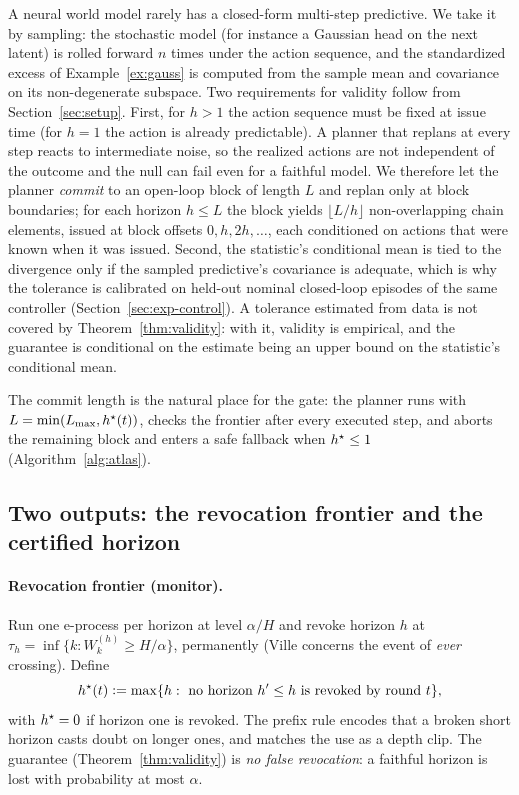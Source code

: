 A neural world model rarely has a closed-form multi-step predictive. We take it by sampling: the stochastic model
(for instance a Gaussian head on the next latent) is rolled forward $n$ times under the action sequence, and the standardized excess of
Example~\ref{ex:gauss} is computed from the sample mean and covariance on its non-degenerate subspace. Two requirements for validity
follow from Section~\ref{sec:setup}. First, for $h>1$ the action sequence must be fixed at issue time (for $h=1$ the action is already predictable). A planner that replans at every step reacts
to intermediate noise, so the realized actions are not independent of the outcome and the null can fail even for a faithful model.
We therefore let the planner \emph{commit} to an open-loop block of length $L$ and replan only at block boundaries; for
each horizon $h\le L$ the block yields $\lfloor L/h\rfloor$ non-overlapping chain elements, issued at block offsets $0,h,2h,\dots$,
each conditioned on actions that were known when it was issued. Second, the statistic's conditional mean is tied to the divergence only if the sampled predictive's covariance is
adequate, which is why the tolerance is calibrated on held-out nominal closed-loop episodes of the same controller (Section~\ref{sec:exp-control}). A tolerance estimated from data is not covered by Theorem~\ref{thm:validity}: with it, validity is empirical, and the guarantee is conditional on the estimate being an upper bound on the statistic's conditional mean.

The commit length is the natural place for the gate: the planner runs with $L=\min(L_{\max},h^{\star}(t))$, checks the frontier after every executed step, and
aborts the remaining block and enters a safe fallback when $h^{\star}\le1$ (Algorithm~\ref{alg:atlas}).

\subsection{Two outputs: the revocation frontier and the certified horizon}\label{sec:frontier}

\paragraph{Revocation frontier (monitor).} Run one e-process per horizon at level $\alpha/H$ and revoke horizon $h$ at
$\tau_h=\inf\{k:W^{(h)}_k\ge H/\alpha\}$, permanently (Ville concerns the event of \emph{ever} crossing). Define
\begin{equation}\label{eq:hstar}
h^{\star}(t)\vcentcolon=\max\{h:\ \text{no horizon }h'\le h\text{ is revoked by round }t\},
\end{equation}
with $h^{\star}=0$ if horizon one is revoked. The prefix rule encodes that a broken short horizon casts
doubt on longer ones, and matches the use as a depth clip. The guarantee (Theorem~\ref{thm:validity}) is
\emph{no false revocation}: a faithful horizon is lost with probability at most $\alpha$.

